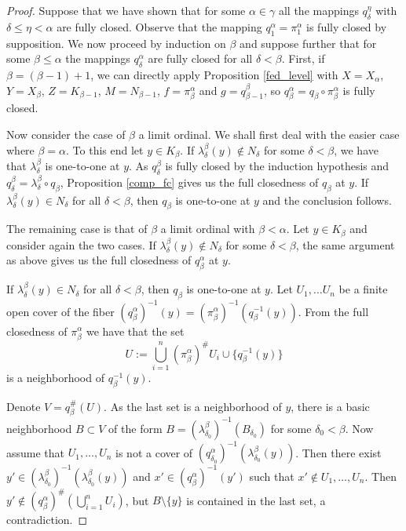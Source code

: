 \documentclass[11pt]{article}
\theoremstyle{definition}
\theoremstyle{remark}
\begin{document}
\begin{proof}
	Suppose that we have shown that for some $\alpha \in \gamma$ all the mappings $q^\eta_\delta$ with $\delta \leq \eta < \alpha$ are fully closed. Observe that the mapping $q^\alpha_1 = \pi^\alpha_1$ is fully closed by supposition. We now proceed by induction on $\beta$ and suppose further that for some $\beta \leq \alpha$ the mappings $q^\alpha_\delta$ are fully closed for all $\delta < \beta$. First, if $\beta = (\beta - 1) + 1$, we can directly apply Proposition \ref{fed_level} with $X = X_\alpha$, $Y = X_\beta$, $Z = K_{\beta - 1}$, $M = N_{\beta - 1}$, $f = \pi^\alpha_\beta$ and $g = q^\beta_{\beta - 1}$, so $q^\alpha_\beta = q_\beta \circ \pi^\alpha_\beta$ is fully closed.
	
	Now consider the case of $\beta$ a limit ordinal. We shall first deal with the easier case where $\beta = \alpha$. To this end let $y \in K_\beta$. If $\lambda^\beta_\delta(y) \notin N_\delta$ for some $\delta < \beta$, we have that $\lambda^\beta_\delta$ is one-to-one at $y$. As $q^\beta_\delta$ is fully closed by the induction hypothesis and $q^\beta_\delta = \lambda^\beta_\delta \circ q_\beta$, Proposition \ref{comp_fc} gives us the full closedness of $q_\beta$ at $y$. If $\lambda^\beta_\delta(y) \in N_\delta$ for all $\delta < \beta$, then $q_\beta$ is one-to-one at $y$ and the conclusion follows.
	
	The remaining case is that of $\beta$ a limit ordinal with $\beta < \alpha$. Let  $y \in K_\beta$ and consider again the two cases. If $\lambda^\beta_\delta(y) \notin N_\delta$ for some $\delta < \beta$, the same argument as above gives us the full closedness of $q^\alpha_\beta$ at $y$.
	
	If $\lambda^\beta_\delta(y) \in N_\delta$ for all $\delta < \beta$, then $q_\beta$ is one-to-one at $y$. Let $U_1, \dots U_n$ be a finite open cover of the fiber $(q^\alpha_\beta)^{-1}(y) = (\pi^\alpha_\beta)^{-1}\left(q_\beta^{-1}(y)\right)$. From the full closedness of $\pi^\alpha_\beta$ we have that the set
	\begin{equation*}
		U := \bigcup_{i = 1}^n (\pi^\alpha_\beta)^\# U_i \cup \{q_\beta^{-1}(y)\}
	\end{equation*} 
	is a neighborhood of $q_\beta^{-1}(y)$.
	
	Denote $V = q_\beta^\#(U)$. As the last set is a neighborhood of $y$, there is a basic neighborhood $B \subset V$ of the form $B = \left(\lambda^\beta_{\delta_0}\right)^{-1}(B_{\delta_0})$ for some $\delta_0 < \beta$. Now assume that $U_1, \dots, U_n$ is not a cover of $(q^\alpha_{\delta_0})^{-1}\left(\lambda^\beta_{\delta_0}(y)\right)$. Then there exist $y' \in (\lambda^\beta_{\delta_0})^{-1}\left(\lambda^\beta_{\delta_0}(y)\right)$ and $x' \in (q^\alpha_\beta)^{-1}(y')$ such that $x' \notin U_1, \dots, U_n$. Then $y' \notin (q^\alpha_\beta)^\#\left(\bigcup\limits_{i = 1}^n U_i\right)$, but $B \setminus \{y\}$ is contained in the last set, a contradiction.
	

\end{proof}
\end{document}
